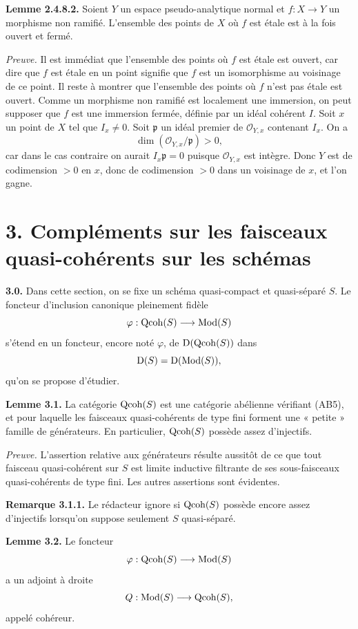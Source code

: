 \documentclass[11pt]{article}
\begin{document}
\textbf{Lemme 2.4.8.2.} Soient $Y$ un espace pseudo-analytique normal et $f:X\to Y$ un morphisme non ramifié. L'ensemble des points de $X$ où $f$ est étale est à la fois ouvert et fermé.

\emph{Preuve.} Il est immédiat que l'ensemble des points où $f$ est étale est ouvert, car dire que $f$ est étale en un point signifie que $f$ est un isomorphisme au voisinage de ce point. Il reste à montrer que l'ensemble des points où $f$ n'est pas étale est ouvert. Comme un morphisme non ramifié est localement une immersion, on peut supposer que $f$ est une immersion fermée, définie par un idéal cohérent $I$. Soit $x$ un point de $X$ tel que $I_x\neq0$. Soit $\mathfrak p$ un idéal premier de $\mathcal O_{Y,x}$ contenant $I_x$. On a
\[
\dim(\mathcal O_{Y,x}/\mathfrak p)>0,
\]
car dans le cas contraire on aurait $I_x\mathfrak p=0$ puisque $\mathcal O_{Y,x}$ est intègre. Donc $Y$ est de codimension $>0$ en $x$, donc de codimension $>0$ dans un voisinage de $x$, et l'on gagne.

\section*{3. Compléments sur les faisceaux quasi-cohérents sur les schémas}

\textbf{3.0.} Dans cette section, on se fixe un schéma quasi-compact et quasi-séparé $S$. Le foncteur d'inclusion canonique pleinement fidèle
\[
\varphi:\operatorname{Qcoh}(S)\longrightarrow\operatorname{Mod}(S)
\]
s'étend en un foncteur, encore noté $\varphi$, de $\mathrm D(\operatorname{Qcoh}(S))$ dans
\[
\mathrm D(S)=\mathrm D(\operatorname{Mod}(S)),
\]
qu'on se propose d'étudier.

\textbf{Lemme 3.1.} La catégorie $\operatorname{Qcoh}(S)$ est une catégorie abélienne vérifiant (AB5), et pour laquelle les faisceaux quasi-cohérents de type fini forment une « petite » famille de générateurs. En particulier, $\operatorname{Qcoh}(S)$ possède assez d'injectifs.

\emph{Preuve.} L'assertion relative aux générateurs résulte aussitôt de ce que tout faisceau quasi-cohérent sur $S$ est limite inductive filtrante de ses sous-faisceaux quasi-cohérents de type fini. Les autres assertions sont évidentes.

\textbf{Remarque 3.1.1.} Le rédacteur ignore si $\operatorname{Qcoh}(S)$ possède encore assez d'injectifs lorsqu'on suppose seulement $S$ quasi-séparé.

\textbf{Lemme 3.2.} Le foncteur
\[
\varphi:\operatorname{Qcoh}(S)\longrightarrow\operatorname{Mod}(S)
\]
a un adjoint à droite
\[
Q:\operatorname{Mod}(S)\longrightarrow\operatorname{Qcoh}(S),
\]
appelé cohéreur.
\end{document}
